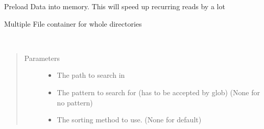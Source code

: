 \documentclass[letterpaper,10pt,openany,oneside,english]{sphinxmanual}
\begin{document}
\begin{fulllineitems}
\begin{fulllineitems}
\end{fulllineitems}


\begin{fulllineitems}
\label{\detokenize{file:file.File.preload_full}}
Preload Data into memory. This will speed up recurring reads by a lot

\end{fulllineitems}


\end{fulllineitems}


\begin{fulllineitems}
\label{\detokenize{file:file.MultiFile}}
Multiple File container for whole directories

\begin{fulllineitems}
\label{\detokenize{file:file.MultiFile.__init__}}~\begin{quote}\begin{description}
\item[{Parameters}] \leavevmode\begin{itemize}
\item {} 
 \textendash{} The path to search in

\item {} 
 \textendash{} The pattern to search for (has to be accepted by glob) (None for no pattern)

\item {} 
 \textendash{} The sorting method to use. (None for default)

\end{itemize}

\end{description}\end{quote}

\end{fulllineitems}



\end{fulllineitems}
\end{document}

